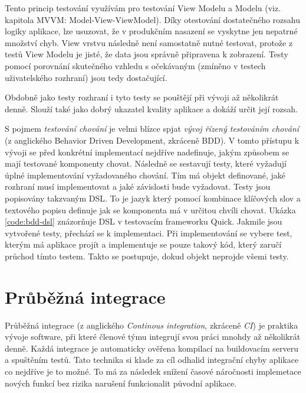 Tento princip testování využívám pro testování View Modelu a Modelu (viz. kapitola MVVM: Model-View-ViewModel).
Díky otestování dostatečného rozsahu logiky aplikace, lze usuzovat, že v produkčním nasazení se vyskytne jen nepatrné množství chyb.
View vrstvu následně není samostatně nutné testovat, protože z testů View Modelu je jisté, že data jsou správně připravena k zobrazení.
Testy pomocí porovnání skutečného vzhledu s očekávaným (zmíněno v testech uživatelského rozhraní) jsou tedy dostačující.

Obdobně jako testy rozhraní i tyto testy se pouštějí při vývoji až několikrát denně.
Slouží také jako dobrý ukazatel kvality aplikace a dokáží určit její rozsah.

S pojmem \textit{testování chování} je velmi blízce spjat \textit{vývoj řízený testováním chování} (z anglického Behavior Driven Development, zkráceně BDD).
V tomto přístupu k vývoji se před konkrétní implementací nejdříve nadefinuje, jakým způsobem se mají testované komponenty chovat.
Následně se sestavují testy, které vyžadují úplné implementování vyžadovaného chování.
Tím má objekt definované, jaké rozhraní musí implementovat a jaké závislosti bude vyžadovat.
Testy jsou popisovány takzvaným DSL.
To je jazyk který pomocí kombinace klíčových slov a textového popisu definuje jak se komponenta má v určitou chvíli chovat.
Ukázka \ref{code:bdd-dsl} znázorňuje DSL v testovacím frameworku Quick.
Jakmile jsou vytvořené testy, přechází se k implementaci.
Při implementování se vybere test, kterým má aplikace projít a implementuje se pouze takový kód, který zaručí průchod tímto testem.
Takto se postupuje, dokud objekt neprojde všemi testy. \cite{objcio-bdd}


\section{Průběžná integrace}

Průběžná integrace (z anglického \textit{Continous integration}, zkráceně \textit{CI}) je praktika vývoje software, při které členové týmu integrují svou práci mnohdy až několikrát denně.
Každá integrace je automaticky ověřena kompilací na buildovacím serveru a spuštěním testů.
Tato technika si klade za cíl odhalid integrační chyby aplikace co nejdříve je to možné.
To má za následek snížení časové náročnosti implemetace nových funkcí bez rizika narušení funkcionalit původní aplikace.

